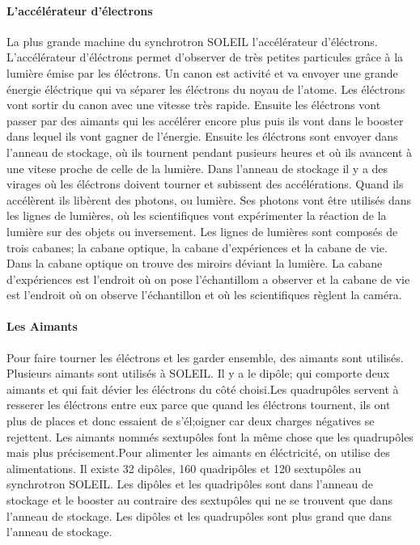 			\paragraph{L'accélérateur d'électrons}
				La plus grande machine du synchrotron SOLEIL\: l'accélérateur d'éléctrons.
				L'accélérateur d'éléctrons permet d'observer de très petites particules grâce à la lumière émise par les éléctrons.
				Un canon est activité et va envoyer une grande énergie éléctrique qui va séparer les éléctrons du noyau de l'atome. Les éléctrons vont sortir du canon avec une vitesse très rapide. Ensuite les éléctrons vont passer par des aimants qui les accélérer encore plus puis ils vont dans le booster dans lequel ils vont gagner de l'énergie. Ensuite les éléctrons sont envoyer dans l'anneau de stockage, où ils tournent pendant pusieurs heures et où ils avancent à une vitese proche de celle de la lumière. Dans l'anneau de stockage il y a des virages où les éléctrons doivent tourner et subissent des accélérations. Quand ils accélèrent ils libèrent des photons, ou lumière. Ses photons vont être utilisés dans les lignes de lumières, où les scientifiques vont expérimenter la réaction de la lumière sur des objets ou inversement. Les lignes de lumières sont composés de trois cabanes; la cabane optique, la cabane d'expériences et la cabane de vie. Dans la cabane optique on trouve des miroirs déviant la lumière. La cabane d'expériences est l'endroit où on pose l'échantillom a observer et la cabane de vie est l'endroit où on observe l'échantillon et où les scientifiques règlent la caméra. 
			
			\paragraph{Les Aimants}
				Pour faire tourner les éléctrons et les garder ensemble, des aimants sont utilisés. Plusieurs aimants sont utilisés à SOLEIL. Il y a le dipôle; qui comporte deux aimants et qui fait dévier les éléctrons du côté choisi.Les quadrupôles servent à resserer les éléctrons entre eux parce que quand les éléctrons tournent, ils ont plus de places et donc essaient de s'él;oigner car deux charges négatives se rejettent. Les aimants nommés sextupôles font la même chose que les quadrupôles mais plus précisement.Pour alimenter les aimants en éléctricité, on utilise des alimentations. Il existe 32 dipôles, 160 quadripôles et 120 sextupôles au synchrotron SOLEIL. Les dipôles et les quadripôles sont dans l'anneau de stockage et le booster au contraire des sextupôles qui ne se trouvent que dans l'anneau de stockage. Les dipôles et les quadrupôles sont plus grand que dans l'anneau de stockage.
			
